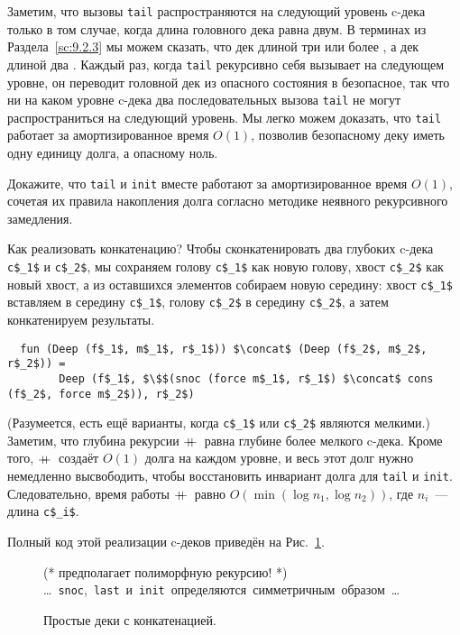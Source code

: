 Заметим, что вызовы \lstinline!tail! распространяются на следующий
уровень c-дека только в том случае, когда длина головного дека равна
двум. В терминах из Раздела~\ref{sc:9.2.3} мы можем сказать, что дек
длиной три или более , а дек длиной два
.  Каждый раз, когда \lstinline!tail!
рекурсивно себя вызывает на следующем уровне, он переводит головной
дек из опасного состояния в безопасное, так что ни на каком уровне
c-дека два последовательных вызова \lstinline!tail! не могут
распространиться на следующий уровень. Мы легко можем доказать, что
\lstinline!tail! работает за амортизированное время $O(1)$, позволив
безопасному деку иметь одну единицу долга, а опасному ноль.

\begin{exercise}\label{ex:11.3}
  Докажите, что \lstinline!tail! и \lstinline!init! вместе работают за
  амортизированное время $O(1)$, сочетая их правила накопления долга
  согласно методике неявного рекурсивного замедления.
\end{exercise}

Как реализовать конкатенацию? Чтобы сконкатенировать два глубоких
c-дека \lstinline!c$_1$! и \lstinline!c$_2$!, мы сохраняем голову
\lstinline!c$_1$! как новую голову, хвост \lstinline!c$_2$! как новый
хвост, а из оставшихся элементов собираем новую середину: хвост
\lstinline!c$_1$! вставляем в середину \lstinline!c$_1$!, голову
\lstinline!c$_2$! в середину \lstinline!c$_2$!, а затем конкатенируем
результаты.
\begin{lstlisting}
  fun (Deep (f$_1$, m$_1$, r$_1$)) $\concat$ (Deep (f$_2$, m$_2$, r$_2$)) =
        Deep (f$_1$, $\$$(snoc (force m$_1$, r$_1$) $\concat$ cons (f$_2$, force m$_2$)), r$_2$)
\end{lstlisting}
(Разумеется, есть ещё варианты, когда \lstinline!c$_1$! или
\lstinline!c$_2$! являются мелкими.) Заметим, что глубина рекурсии
$+\!\!\!+\,$ равна глубине более мелкого c-дека. Кроме того, $+\!\!\!+\,$
создаёт $O(1)$ долга на каждом уровне, и весь этот долг нужно
немедленно высвободить, чтобы восстановить инвариант долга для
\lstinline!tail! и \lstinline!init!. Следовательно, время работы
$+\!\!\!+\,$ равно $O(\min (\log n_1, \log n_2))$, где $n_i$~--- длина
\lstinline!c$_i$!. 

Полный код этой реализации c-деков приведён на Рис.~\ref{fig:11.3}.

\begin{figure}
  \centering
  (* $\mbox{предполагает полиморфную рекурсию!}$ *)  \\
  \mbox{\ldots{} \lstinline!snoc!, \lstinline!last! и \lstinline!init!
    определяются симметричным образом \ldots}\\
  
  \caption{Простые деки с конкатенацией.}
  \label{fig:11.3}
\end{figure}

